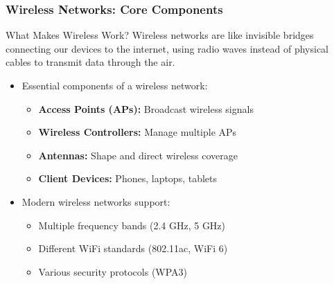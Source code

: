\documentclass{beamer}
\begin{document}
\begin{frame}
    \frametitle{Wireless Networks: Core Components}
    
    \begin{block}{What Makes Wireless Work?}
        Wireless networks are like invisible bridges connecting our devices to the internet, using radio waves instead of physical cables to transmit data through the air.
    \end{block}
    
    \begin{itemize}
        \item Essential components of a wireless network:
        \begin{itemize}
            \item \textbf{Access Points (APs):} Broadcast wireless signals
            \item \textbf{Wireless Controllers:} Manage multiple APs
            \item \textbf{Antennas:} Shape and direct wireless coverage
            \item \textbf{Client Devices:} Phones, laptops, tablets
        \end{itemize}
        
        \item Modern wireless networks support:
        \begin{itemize}
            \item Multiple frequency bands (2.4 GHz, 5 GHz)
            \item Different WiFi standards (802.11ac, WiFi 6)
            \item Various security protocols (WPA3)
        \end{itemize}
    \end{itemize}
\end{frame}
\end{document}
